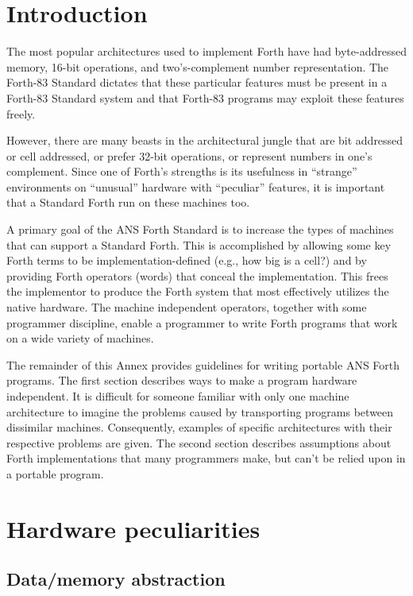 \label{annex:port}

\section{Introduction} %

The most popular architectures used to implement Forth have had
byte-addressed memory, 16-bit op\-er\-a\-tions, and two's-complement
number representation. The Forth-83 Standard dictates that these
particular features must be present in a Forth-83 Standard system
and that Forth-83 programs may exploit these features freely.

However, there are many beasts in the architectural jungle that are
bit addressed or cell addressed, or prefer 32-bit operations, or
represent numbers in one's complement. Since one of Forth's strengths
is its usefulness in ``strange'' environments on ``unusual'' hardware
with ``peculiar'' features, it is important that a Standard Forth run
on these machines too.

A primary goal of the ANS Forth Standard is to increase the types of
machines that can support a Standard Forth. This is accomplished by
allowing some key Forth terms to be implementation-defined (e.g., how
big is a cell?) and by providing Forth operators (words) that conceal
the implementation. This frees the implementor to produce the Forth
system that most effectively utilizes the native hardware. The machine
independent operators, together with some programmer discipline, enable
a programmer to write Forth programs that work on a wide variety of
machines.

The remainder of this Annex provides guidelines for writing portable
ANS Forth programs. The first section describes ways to make a program
hardware independent. It is difficult for someone familiar with only
one machine architecture to imagine the problems caused by transporting
programs between dissimilar machines. Consequently, examples of specific
architectures with their respective problems are given. The second
section describes assumptions about Forth implementations that many
programmers make, but can't be relied upon in a portable program.

\section{Hardware peculiarities} %
\label{port:hardware}

\subsection{Data/memory abstraction} %


